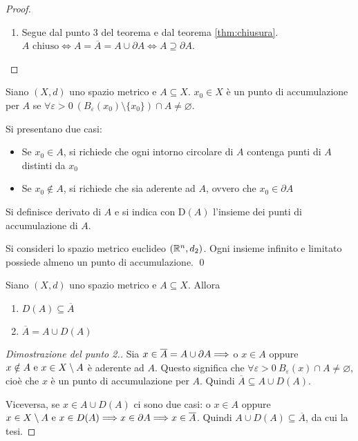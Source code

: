 \begin{proof}
\begin{enumerate}
        \item Segue dal punto 3 del teorema e dal teorema \ref{thm:chiusura}. $A \text{ chiuso} \iff A = \overline{A} = A \cup \partial A \iff A \supseteq \partial A$.
    \end{enumerate}
\end{proof}

\begin{definition}
    Siano $(X, d)$ uno spazio metrico e $A \subseteq X$. $x_0 \in X$ è un punto di accumulazione per $A$ se $\forall \varepsilon > 0 \ (B_\varepsilon(x_0)\setminus \{x_0\})\cap A \neq \varnothing$.
\end{definition}

\begin{remark}
    Si presentano due casi:
    \begin{itemize}
        \item Se $x_0 \in A$, si richiede che ogni intorno circolare di $A$ contenga punti di $A$ distinti da $x_0$
        \item Se $x_0 \notin A$, si richiede che sia aderente ad $A$, ovvero che $x_0 \in \partial A$
    \end{itemize}
\end{remark}

\begin{definition}
    Si definisce derivato di $A$ e si indica con $\text{D}(A)$ l'insieme dei punti di accumulazione di $A$.
\end{definition}

\begin{theorem}
    \label{thm:BW}
    Si consideri lo spazio metrico euclideo $(\mathbb{R}^n, d_2)$. Ogni insieme infinito e limitato possiede almeno un punto di accumulazione.
    \qed
\end{theorem}

\begin{prop}
    Siano $(X,d)$ uno spazio metrico e $A\subseteq X$. Allora
    \begin{enumerate}
        \item $D(A)\subseteq \overline{A}$
        \item $\overline{A} = A \cup D(A)$
    \end{enumerate}
\end{prop}

\begin{proof}
    [Dimostrazione del punto 2.]
    Sia $x \in \overline{A}=A\cup\partial A\Longrightarrow$ o $x \in A$ oppure $x\notin A \text{ e } x\in X\setminus A$ è aderente ad $A$. Questo significa che $\forall \varepsilon > 0 \ B_\varepsilon(x)\cap A \neq \varnothing$, cioè che $x$ è un punto di accumulazione per $A$. Quindi $\overline{A}\subseteq A \cup D(A)$.

    Viceversa, se $x\in A\cup D(A)$ ci sono due casi: o $x \in A$ oppure $x \in X\setminus A \text{ e } x \in D(A)\Longrightarrow x \in \partial A\Longrightarrow x \in \overline{A}$. Quindi $A\cup D(A)\subseteq \overline{A}$, da cui la tesi.
\end{proof}

